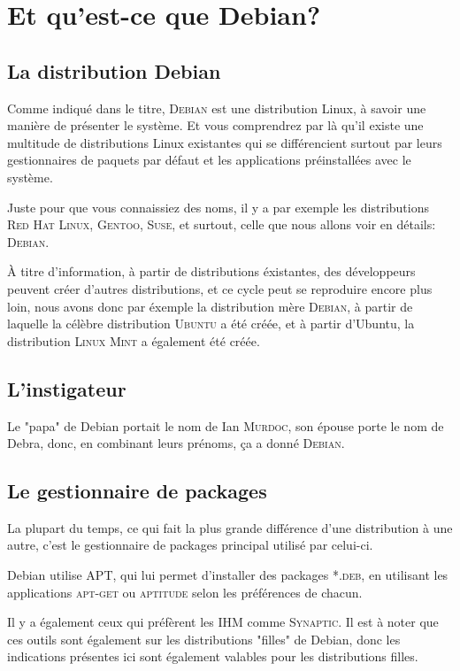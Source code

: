 \chapter{Et qu'est-ce que Debian?}

\section{La distribution Debian}

Comme indiqué dans le titre, \textsc{Debian} est une distribution Linux, à savoir
une manière de présenter le système. Et vous comprendrez par là qu'il existe
une multitude de distributions Linux existantes qui se différencient surtout
par leurs gestionnaires de paquets par défaut et les applications préinstallées
avec le système.

Juste pour que vous connaissiez des noms, il y a par exemple les distributions
\textsc{Red Hat Linux}, \textsc{Gentoo}, \textsc{Suse}, et surtout, celle que
nous allons voir en détails: \textsc{Debian}.

À titre d'information, à partir de distributions éxistantes, des développeurs
peuvent créer d'autres distributions, et ce cycle peut se reproduire encore
plus loin, nous avons donc par éxemple la distribution mère \textsc{Debian},
à partir de laquelle la célèbre distribution \textsc{Ubuntu} a été créée, et
à partir d'Ubuntu, la distribution \textsc{Linux Mint} a également été créée.

\section{L'instigateur}

Le "papa" de Debian portait le nom de Ian \textsc{Murdoc}, son épouse porte le nom
de Debra, donc, en combinant leurs prénoms, ça a donné \textsc{Debian}.

\section{Le gestionnaire de packages}

La plupart du temps, ce qui fait la plus grande différence d'une distribution à
une autre, c'est le gestionnaire de packages principal utilisé par celui-ci.

Debian utilise \textsc{APT}, qui lui permet d'installer des packages \textsc{*.deb},
en utilisant les applications \textsc{apt-get} ou \textsc{aptitude} selon les
préférences de chacun.

Il y a également ceux qui préfèrent les IHM comme \textsc{Synaptic}. Il est à noter
que ces outils sont également sur les distributions "filles" de Debian, donc les
indications présentes ici sont également valables pour les distributions filles.
